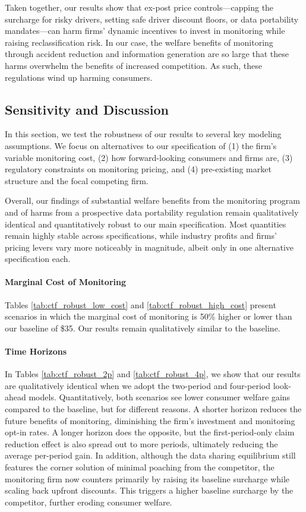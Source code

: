 Taken together, our results show that ex-post price controls---capping the surcharge for risky drivers, setting safe driver discount floors, or data portability mandates---can harm firms' dynamic incentives to invest in monitoring while raising reclassification risk. In our case, the welfare benefits of monitoring through accident reduction and information generation are so large that these harms overwhelm the benefits of increased competition. As such, these regulations wind up harming consumers.

\subsection{Sensitivity and Discussion}\label{subsec:model_sensitivity}

In this section, we test the robustness of our results to several key modeling assumptions. We focus on alternatives to our specification of (1) the firm's variable monitoring cost, (2) how forward-looking consumers and firms are,
(3) regulatory constraints on monitoring pricing, and (4) pre-existing market structure and the focal competing firm.

Overall, our findings of substantial welfare benefits from the monitoring program and of harms from a prospective data portability regulation remain qualitatively identical and quantitatively robust to our main specification. Most quantities remain highly stable across specifications, while industry profits and firms' pricing levers vary more noticeably in magnitude, albeit only in one alternative specification each.

\paragraph{Marginal Cost of Monitoring}
Tables \ref{tab:ctf_robust_low_cost} and \ref{tab:ctf_robust_high_cost} present scenarios in which the marginal cost of monitoring is 50\% higher or lower than our baseline of \$35. Our results remain qualitatively similar to the baseline.

\paragraph{Time Horizons}
In Tables \ref{tab:ctf_robust_2p} and \ref{tab:ctf_robust_4p}, we show that our results are qualitatively identical when we adopt the two-period and four-period look-ahead models. Quantitatively, both scenarios see lower consumer welfare gains compared to the baseline, but for different reasons. A shorter horizon reduces the future benefits of monitoring, diminishing the firm's investment and monitoring opt-in rates. A longer horizon does the opposite, but the first-period-only claim reduction effect is also spread out to more periods, ultimately reducing the average per-period gain. In addition, although the data sharing equilibrium still features the corner solution of minimal poaching from the competitor, the monitoring firm now counters primarily by raising its baseline surcharge while scaling back upfront discounts. This triggers a higher baseline surcharge by the competitor, further eroding consumer welfare.

